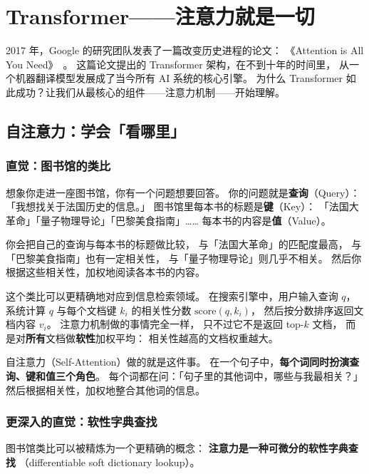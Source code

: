 \chapter{Transformer——注意力就是一切}
\label{ch:transformer}

2017 年，Google 的研究团队发表了一篇改变历史进程的论文：
《Attention is All You Need》~\cite{vaswani2017attention}。
这篇论文提出的 Transformer 架构，在不到十年的时间里，
从一个机器翻译模型发展成了当今所有 AI 系统的核心引擎。
为什么 Transformer 如此成功？让我们从最核心的组件——注意力机制——开始理解。

\section{自注意力：学会「看哪里」}

\subsection{直觉：图书馆的类比}

想象你走进一座图书馆，你有一个问题想要回答。
你的问题就是\textbf{查询}（Query）：
「我想找关于法国历史的信息。」
图书馆里每本书的标题是\textbf{键}（Key）：
「法国大革命」「量子物理导论」「巴黎美食指南」……
每本书的内容是\textbf{值}（Value）。

你会把自己的查询与每本书的标题做比较，
与「法国大革命」的匹配度最高，
与「巴黎美食指南」也有一定相关性，
与「量子物理导论」则几乎不相关。
然后你根据这些相关性，加权地阅读各本书的内容。

这个类比可以更精确地对应到信息检索领域。
在搜索引擎中，用户输入查询 $q$，
系统计算 $q$ 与每个文档键 $k_i$ 的相关性分数 $\mathrm{score}(q, k_i)$，
然后按分数排序返回文档内容 $v_i$。
注意力机制做的事情完全一样，
只不过它不是返回 top-$k$ 文档，
而是对\textbf{所有}文档做\textbf{软性}加权平均：
相关性越高的文档权重越大。

自注意力（Self-Attention）做的就是这件事。
在一个句子中，\textbf{每个词同时扮演查询、键和值三个角色}。
每个词都在问：「句子里的其他词中，哪些与我最相关？」
然后根据相关性，加权地整合其他词的信息。

\subsection{更深入的直觉：软性字典查找}

图书馆类比可以被精炼为一个更精确的概念：
\textbf{注意力是一种可微分的软性字典查找}
（differentiable soft dictionary lookup）。


